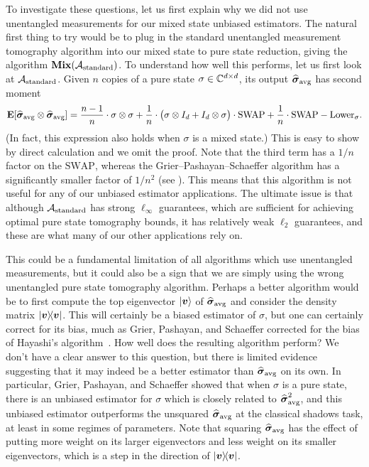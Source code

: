 \documentclass{article}
\newcommand{\mixed}{\textup{\textbf{Mix}}}
\newcommand{\swap}{\mathrm{SWAP}}
\begin{document}
To investigate these questions, let us first explain why we did not use unentangled measurements for our mixed state unbiased estimators.
The natural first thing to try would be to plug in the standard unentangled measurement tomography algorithm into our mixed state to pure state reduction, giving the algorithm $\mixed(\calA_{\mathrm{standard}})$.
To understand how well this performs, let us first look at $\mathcal{A}_{\mathrm{standard}}$.
Given $n$ copies of a pure state $\sigma \in \mathbb C^{d \times d}$,
its output $\widehat{\boldsymbol{\sigma}}_{\mathrm{avg}}$ has second moment
\begin{equation*}
    \E[\widehat{\bsigma}_{\mathrm{avg}}\otimes \widehat{\bsigma}_{\mathrm{avg}}] = \frac{n-1}{n} \cdot \sigma \otimes \sigma + \frac{1}{n} \cdot \big(\sigma \otimes I_d + I_d \otimes \sigma\big) \cdot \swap + \frac{1}{n} \cdot \swap-\mathrm{Lower}_{\sigma}.
\end{equation*}
(In fact, this expression also holds when $\sigma$ is a mixed state.)
This is easy to show by direct calculation and we omit the proof. 
Note that the third term has a $1/n$ factor on the $\swap$, whereas the Grier--Pashayan--Schaeffer algorithm has a significantly smaller factor of $1/n^2$ (see ).
This means that this algorithm is not useful for any of our unbiased estimator applications. 
The ultimate issue is that although $\mathcal{A}_{\mathrm{standard}}$ has strong $\ell_{\infty}$ guarantees, which are sufficient for achieving optimal pure state tomography bounds,
it has relatively weak $\ell_2$ guarantees, and these are what many of our other applications rely on.

This could be a fundamental limitation of all algorithms which use unentangled measurements, but it could also be a sign that we are simply using the wrong unentangled pure state tomography algorithm.
Perhaps a better algorithm would be to first compute the top eigenvector $\ket{\boldsymbol{v}}$ of $\widehat{\boldsymbol{\sigma}}_{\mathrm{avg}}$
and consider the density matrix $\ketbra{\boldsymbol{v}}$.
This will certainly be a biased estimator of $\sigma$, but one can certainly correct for its bias, much as Grier, Pashayan, and Schaeffer corrected for the bias of Hayashi's algorithm~\cite{GPS24}. 
How well does the resulting algorithm perform?
We don't have a clear answer to this question, but there is limited evidence suggesting that it may indeed be a better estimator than $\widehat{\boldsymbol{\sigma}}_{\mathrm{avg}}$ on its own.
In particular, Grier, Pashayan, and Schaeffer showed that when $\sigma$ is a pure state, there is an unbiased estimator for $\sigma$ which is closely related to $\widehat{\boldsymbol{\sigma}}_{\mathrm{avg}}^2$, and this unbiased estimator outperforms the unsquared $\widehat{\boldsymbol{\sigma}}_{\mathrm{avg}}$ at the classical shadows task, at least in some regimes of parameters.
Note that squaring $\widehat{\boldsymbol{\sigma}}_{\mathrm{avg}}$ has the effect of putting more weight on its larger eigenvectors and less weight on its smaller eigenvectors, which is a step in the direction of $\ketbra{\boldsymbol{v}}$.
\end{document}
